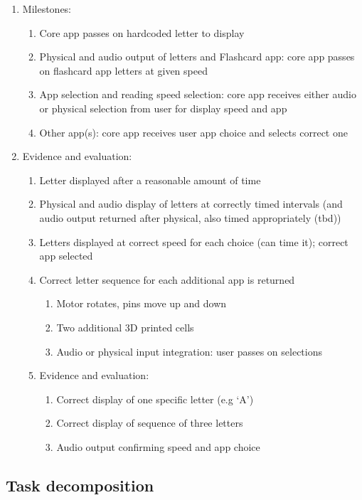 \documentclass{article}
\begin{document}
\begin{enumerate}
  \item Milestones:
  \begin{enumerate}
    \item Core app passes on hardcoded letter to display
    \item Physical and audio output of letters and Flashcard app: core app passes on flashcard app letters at given speed
    \item App selection and reading speed selection: core app receives either audio or physical selection from user for display speed and app
    \item Other app(s): core app receives user app choice and selects correct one
  \end{enumerate}
  \item Evidence and evaluation:
  \begin{enumerate}
    \item Letter displayed after a reasonable amount of time
    \item Physical and audio display of letters at correctly timed intervals (and audio output returned after physical, also timed appropriately (tbd))
    \item Letters displayed at correct speed for each choice (can time it); correct app selected
    \item Correct letter sequence for each additional app is returned
    \begin{enumerate}
      \item Motor rotates, pins move up and down
      \item Two additional 3D printed cells
      \item Audio or physical input integration: user passes on selections
    \end{enumerate}
    \item Evidence and evaluation:
    \begin{enumerate}
      \item Correct display of one specific letter (e.g `A')
      \item Correct display of sequence of three letters
      \item Audio output confirming speed and app choice
    \end{enumerate}
  \end{enumerate}
\end{enumerate}


\subsection{Task decomposition}
\end{document}
